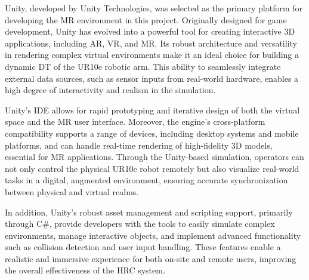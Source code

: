 Unity, developed by Unity Technologies, was selected as the primary platform for developing the \ac{MR} environment in this project. Originally designed for game development, Unity has evolved into a powerful tool for creating interactive 3D applications, including \ac{AR}, \ac{VR}, and \ac{MR}. Its robust architecture and versatility in rendering complex virtual environments make it an ideal choice for building a dynamic \ac{DT} of the UR10e robotic arm. This ability to seamlessly integrate external data sources, such as sensor inputs from real-world hardware, enables a high degree of interactivity and realism in the simulation.

Unity’s \ac{IDE} allows for rapid prototyping and iterative design of both the virtual space and the \ac{MR} user interface. Moreover, the engine's cross-platform compatibility supports a range of devices, including desktop systems and mobile platforms, and can handle real-time rendering of high-fidelity 3D models, essential for \ac{MR} applications. Through the Unity-based simulation, operators can not only control the physical UR10e robot remotely but also visualize real-world tasks in a digital, augmented environment, ensuring accurate synchronization between physical and virtual realms.

In addition, Unity’s robust asset management and scripting support, primarily through C\#, provide developers with the tools to easily simulate complex environments, manage interactive objects, and implement advanced functionality such as collision detection and user input handling. These features enable a realistic and immersive experience for both on-site and remote users, improving the overall effectiveness of the \ac{HRC} system.







